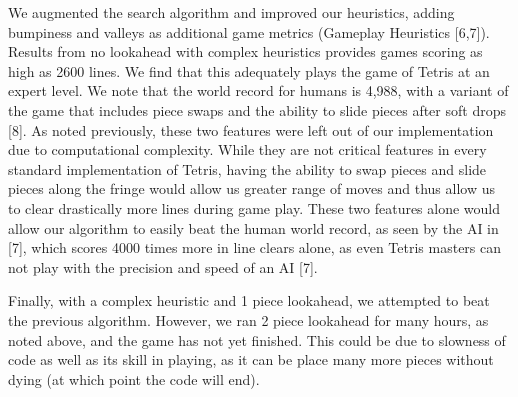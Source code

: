 \documentclass[11pt]{article}
\begin{document}
We augmented the search algorithm and improved our heuristics, adding bumpiness and valleys as additional game metrics (Gameplay Heuristics [6,7]). Results from no lookahead with complex heuristics provides games scoring as high as 2600 lines. We find that this adequately plays the game of Tetris at an expert level. We note that the world record for humans is 4,988, with a variant of the game that includes piece swaps and the ability to slide pieces after soft drops [8]. As noted previously, these two features were left out of our implementation due to computational complexity. While they are not critical features in every standard implementation of Tetris, having the ability to swap pieces and slide pieces along the fringe would allow us greater range of moves and thus allow us to clear drastically more lines during game play. These two features alone would allow our algorithm to easily beat the human world record, as seen by the AI in [7], which scores 4000 times more in line clears alone, as even Tetris masters can not play with the precision and speed of an AI [7].

Finally, with a complex heuristic and 1 piece lookahead, we attempted to beat the previous algorithm. However, we ran 2 piece lookahead for many hours, as noted above, and the game has not yet finished. This could be due to slowness of code as well as its skill in playing, as it can be place many more pieces without dying (at which point the code will end).
\end{document}
